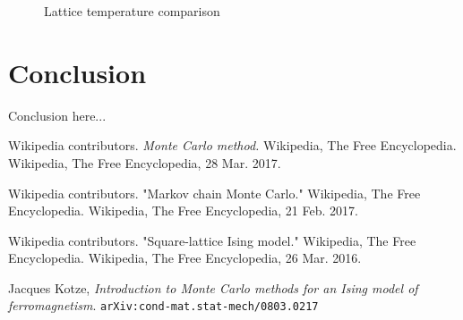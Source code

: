 \documentclass{article}
\begin{document}
\begin{figure}[H]
  \begin{center}
  \end{center}
  \caption{Lattice temperature comparison}
  \label{fig:mag_susc}
\end{figure}

\section{Conclusion}

Conclusion here...

\begin{thebibliography}{9}

    Wikipedia contributors. \emph{Monte Carlo method.} Wikipedia, The Free Encyclopedia. Wikipedia, The Free Encyclopedia, 28 Mar. 2017.

    Wikipedia contributors. "Markov chain Monte Carlo." Wikipedia, The Free Encyclopedia. Wikipedia, The Free Encyclopedia, 21 Feb. 2017.

    Wikipedia contributors. "Square-lattice Ising model." Wikipedia, The Free Encyclopedia. Wikipedia, The Free Encyclopedia, 26 Mar. 2016.

	  Jacques Kotze,
	  \emph{Introduction to Monte Carlo methods for an Ising model of ferromagnetism}.
    \tt{arXiv:cond-mat.stat-mech/0803.0217}

\end{thebibliography}
\end{document}
